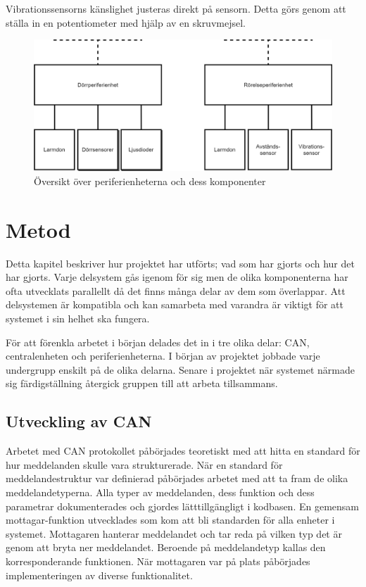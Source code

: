 \documentclass[a4paper]{article}
\begin{document}
Vibrationssensorns känslighet justeras direkt på sensorn.
Detta görs genom att ställa in en potentiometer med hjälp av en skruvmejsel.

\begin{figure}[H]
    \centering
    \includegraphics[width=\textwidth]{periferi-oversikt-pp.png}
    \caption{Översikt över periferienheterna och dess komponenter}
\end{figure}

\newpage

\section{Metod}
Detta kapitel beskriver hur projektet har utförts; vad som har gjorts och hur det har gjorts.
Varje delsystem gås igenom för sig men de olika komponenterna har ofta utvecklats parallellt då det finns många delar av dem som överlappar.
Att delsystemen är kompatibla och kan samarbeta med varandra är viktigt för att systemet i sin helhet ska fungera.

För att förenkla arbetet i början delades det in i tre olika delar: CAN, centralenheten och periferienheterna.
I början av projektet jobbade varje undergrupp enskilt på de olika delarna.
Senare i projektet när systemet närmade sig färdigställning återgick gruppen till att arbeta tillsammans.

\subsection{Utveckling av CAN}
Arbetet med CAN protokollet påbörjades teoretiskt med att hitta en standard för hur meddelanden skulle vara strukturerade.
När en standard för meddelandestruktur var definierad påbörjades arbetet med att ta fram de olika meddelandetyperna.
Alla typer av meddelanden, dess funktion och dess parametrar dokumenterades och gjordes lätttillgängligt i kodbasen.
En gemensam mottagar-funktion utvecklades som kom att bli standarden för alla enheter i systemet.
Mottagaren hanterar meddelandet och tar reda på vilken typ det är genom att bryta ner meddelandet.
Beroende på meddelandetyp kallas den korresponderande funktionen.
När mottagaren var på plats påbörjades implementeringen av diverse funktionalitet.
\end{document}
